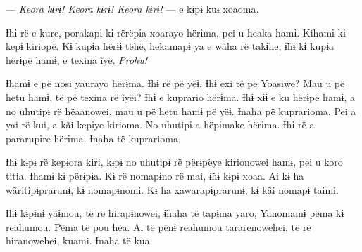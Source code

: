 --- \textit{Keora kɨrɨ! Keora kɨrɨ! Keora kɨrɨ!} --- e kɨpɨ kuɨ xoaoma. 

Ɨhɨ rë e kure, porakapɨ kɨ rërëpɨa xoarayo hërɨma, pei u heaka hamɨ.
Kihamɨ kɨ kepɨ kiriopë. Kɨ kupɨa hërɨɨ tëhë, hekamapɨ ya e wãha rë
takɨhe, ɨ̃hɨ kɨ kupɨa hërɨpë hamɨ, e texina ĩyë. \textit{Prohu!} 

Ɨhamɨ e pë nosi yaurayo hërɨma. Ɨhɨ rë pë yëɨ. Ɨhɨ exi të pë Yoasiwë?
Mau u pë hetu hamɨ, të pë texina rë ĩyëi? Ɨhɨ e kuprario hërɨma. Ɨhɨ xɨɨ
e ku hërɨpë hamɨ, a no uhutipɨ rë hëaanowei, mau u pë hetu hamɨ pë yëɨ.
Ɨnaha pë kuprarioma. Pei a yai rë kui, a kãi kepɨye kirioma. No uhutipɨ
a hëpɨmake hërɨma. Ɨhɨ rë a pararupɨre hërɨma. Ɨnaha të kuprarioma. 

Ɨhɨ kɨpɨ rë kepɨora kiri, kɨpɨ no uhutipɨ rë përɨpëye kirionowei hamɨ,
pei u koro titia. Ɨhamɨ kɨ përɨpɨa. Kɨ rë nomapɨno rë mai, ɨ̃hɨ kɨpɨ
xoaa. Ai kɨ ha wãritipɨprarunɨ, kɨ nomapɨnomi. Kɨ ha xawarapɨprarunɨ, kɨ
kãi nomapɨ taimi. 

Ɨhɨ kɨpɨnɨ yãɨmou, të rë hirapɨnowei, ɨ̃naha të tapɨma yaro, Yanomamɨ
pëma kɨ reahumou. Pëma të pou hëa. Ai të pënɨ reahumou tararenowehei, të
rë hiranowehei, kuami. Ɨnaha të kua.
